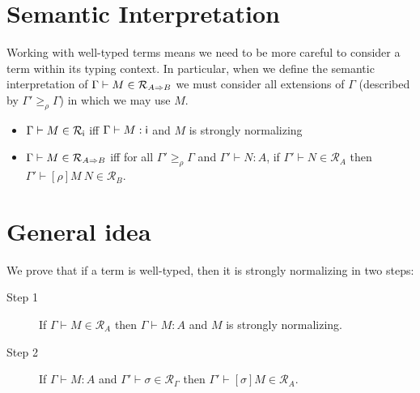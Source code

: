 \documentclass{article}
\newcommand{\ext}[1]{\geq_{#1}}
\newcommand{\SN}{\mathsf{SN}}
\newcommand{\denot}[1]{\mathcal{R}_{#1}}
\newcommand{\inden}[3]{#1 \vdash #2 \in \denot{#3}}
\def\lv{\mathopen{{[\kern-0.14em[}}}    %
\def\rv{\mathclose{{]\kern-0.14em]}}}   %
\newcommand{\den}[1]{\lv #1 \rv}
\begin{document}
\section{Semantic Interpretation}
Working with well-typed terms means we need to be more careful to
consider a term within its typing context. In particular, when we
define the semantic interpretation of $\inden{\Gamma}{M}{A \arrow B}$
we must consider all extensions of $\Gamma$ (described by $\Gamma'
\ext \rho \Gamma$) in which we may use $M$.

\begin{itemize}
\item $\inden{\Gamma}{M}{\base}$ iff $\Gamma \vdash M\mathrel{:} \textsf{i}$ and $M$ is strongly normalizing
\item $\inden{\Gamma}{M}{A \arrow B}$ iff for all $\Gamma' \ext{\rho} \Gamma$ and $\Gamma' \vdash N :A$, if $\inden{\Gamma'}{N}{A}$ then $\inden{\Gamma'}{[\rho]M~N}{B}$.
\end{itemize}







\section{General idea}

We prove that if a term is well-typed, then it is strongly normalizing in  two steps:

\begin{description}
\item[Step 1] If $\inden{\Gamma}{M}{A}$ then $\Gamma \vdash M : A$ and $M$ is strongly normalizing.
\item[Step 2] If $\Gamma \vdash M : A$ and $\inden{\Gamma'}{\sigma}{\Gamma}$ then $\inden{\Gamma'}{[\sigma]M}{A}$.
\end{description}
\end{document}

